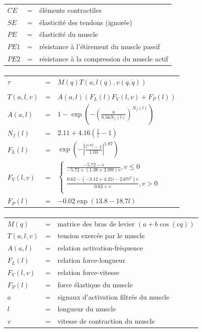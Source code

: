 \documentclass[pdftex,a4paper,11pt]{article}
\numberwithin{equation}{subsection}
\begin{document}
\begin{tabular}{lcl}
    $CE$  & = & éléments contractiles \\
    $SE$  & = & élasticité des tendons (ignorée) \\
    $PE$  & = & élasticité du muscle \\
    $PE1$ & = & résistance à l'étirement du muscle passif \\
    $PE2$ & = & résistance à la compression du muscle actif \\
\end{tabular}

\paragraph{}
\begin{tabular}{lcl}
    $\tau$ & = & $M(q) T(a, l(q), v(q, \dot{q}))$ \\
    \\
    $T(a, l, v)$ & = & $A(a,l)(F_L(l) F_V(l,v) + F_P(l))$ \\
    $A(a, l)$    & = & $1 - \exp \left(- \left(\frac{a}{0.56 N_f(l)}\right)^{N_f(l)}\right)$ \\
    $N_f(l)$     & = & $2.11 + 4.16 \left(\frac{1}{l} - 1\right)$ \\
    $F_L(l)$     & = & $\exp \left(-\left|\frac{l^{1.93} - 1}{1.03}\right|^{1.87}\right)$ \\
    $F_V(l, v)$  & = & $\left\{ 
        \begin{array}{l}
            \frac{-5.72 - v}{-5.72 + (1.38 + 2.09 l) v}, v \leq 0 \\
            \frac{0.62 - \left(-3.12 + 4.21 l - 2.67 l^2\right) v}{0.62 + v}, v > 0 \\
        \end{array}
        \right.$ \\
    $F_P(l)$     & = & $-0.02 \exp(13.8 - 18.7 l)$ \\
\end{tabular}

\paragraph{}
\begin{tabular}{lcl}
    $M(q)$  & = & matrice des bras de levier $(a + b \cos (c q))$ \\
    $T(a, l, v)$ & = & tension exercée par le muscle \\
    $A(a, l)$    & = & relation activation-fréquence \\
    $F_L(l)$     & = & relation force-longueur \\
    $F_V(l, v)$  & = & relation force-vitesse \\
    $F_P(l)$     & = & force élastique du muscle \\ %
    $a$          & = & signaux d'activation filtrés du muscle \\
    $l$          & = & longueur du muscle \\
    $v$          & = & vitesse de contraction du muscle \\
\end{tabular}
\end{document}
